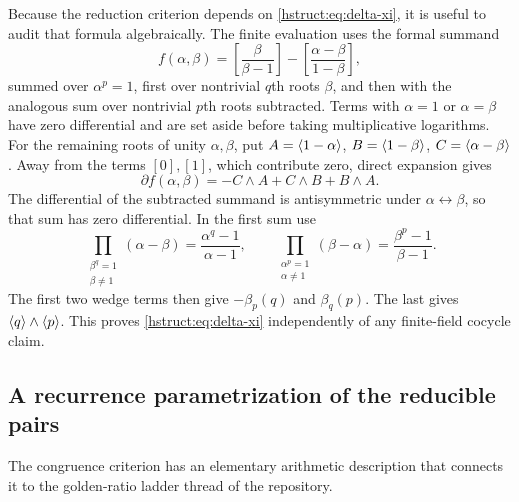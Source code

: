 Because the reduction criterion depends on \eqref{hstruct:eq:delta-xi}, it is
useful to audit that formula algebraically. The finite evaluation uses
the formal summand
\[
 f(\alpha,\beta)=
 \left[\frac{\beta}{\beta-1}\right]
 -\left[\frac{\alpha-\beta}{1-\beta}\right],
\]
summed over $\alpha^p=1$, first over nontrivial $q$th roots $\beta$, and
then with the analogous sum over nontrivial $p$th roots subtracted.
Terms with $\alpha=1$ or $\alpha=\beta$ have zero differential and
are set aside before taking multiplicative logarithms. For the remaining
roots of unity $\alpha,\beta$, put
$A=\langle 1-\alpha\rangle$, $B=\langle 1-\beta\rangle$,
$C=\langle \alpha-\beta\rangle$. Away from the terms $[0],[1]$, which contribute
zero, direct expansion gives
\[
 \partial f(\alpha,\beta)=-C\wedge A+C\wedge B+B\wedge A.
\]
The differential of the subtracted summand is antisymmetric under
$\alpha\leftrightarrow\beta$, so that sum has zero differential.
In the first sum use
\[
 \prod_{\substack{\beta^q=1\\\beta\ne1}}(\alpha-\beta)
 =\frac{\alpha^q-1}{\alpha-1},\qquad
 \prod_{\substack{\alpha^p=1\\\alpha\ne1}}(\beta-\alpha)
 =\frac{\beta^p-1}{\beta-1}.
\]
The first two wedge terms then give $-\beta_p(q)$ and $\beta_q(p)$.
The last gives $\langle q\rangle\wedge\langle p\rangle$. This proves
\eqref{hstruct:eq:delta-xi} independently of any finite-field cocycle claim.

\subsection{A recurrence parametrization of the reducible pairs}

The congruence criterion has an elementary arithmetic description that
connects it to the golden-ratio ladder thread of the repository.

